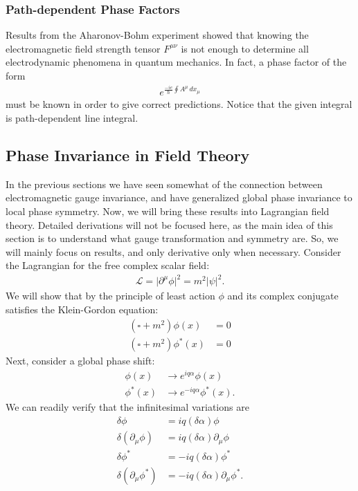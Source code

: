 \documentclass[a4paper,11pt]{article}
\numberwithin{equation}{section}
\theoremstyle{definition}
\newcommand{\p}{\partial}
\newcommand{\lag}{\mathcal{L}}
\begin{document}
\subsubsection{Path-dependent Phase Factors}
Results from the Aharonov-Bohm experiment showed that knowing the electromagnetic field strength tensor $F^{\mu\nu}$ is not enough to determine all electrodynamic phenomena in quantum mechanics. In fact, a phase factor of the form
\begin{align*}
e^{\frac{-ie}{\hbar}\oint A^\mu\,dx_\mu}
\end{align*}
must be known in order to give correct predictions. Notice that the given integral is path-dependent line integral. 

\subsection{Phase Invariance in Field Theory}
In the previous sections we have seen somewhat of the connection between electromagnetic gauge invariance, and have generalized global phase invariance to local phase symmetry. Now, we will bring these results into Lagrangian field theory. Detailed derivations will not be focused here, as the main idea of this section is to understand what gauge transformation and symmetry are. So, we will mainly focus on results, and only derivative only when necessary. Consider the Lagrangian for the free complex scalar field: 
\begin{align*}
\lag = \vert \p^\mu \phi \vert^2 = m^2\vert \psi \vert^2.
\end{align*}
We will show that by the principle of least action $\phi$ and its complex conjugate satisfies the Klein-Gordon equation:
\begin{align*}
(\square + m^2)\phi(x) &= 0\\
(\square + m^2)\phi^*(x) &= 0
\end{align*}
Next, consider a global phase shift:
\begin{align*}
\phi(x)&\to e^{iq\alpha}\phi(x)\\
\phi^*(x) &\to e^{-iq\alpha}\phi^*(x).
\end{align*}
We can readily verify that the infinitesimal variations are
\begin{align*}
\delta \phi &= iq(\delta \alpha)\phi\\
\delta(\p_\mu\phi) &= iq(\delta \alpha)\p_\mu\phi\\
\delta \phi^* &= -iq(\delta \alpha)\phi^*\\
\delta(\p_\mu\phi^*) &= -iq(\delta \alpha)\p_\mu\phi^*.
\end{align*}
\end{document}
